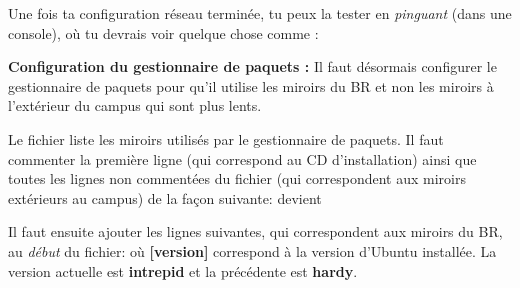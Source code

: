 % 
% 
% 
% 


Une fois ta configuration réseau terminée, tu peux la tester en \emph{pinguant} \fkz (dans une console), où tu devrais voir quelque chose comme :


\label{ubuntu_mirror} {\bf Configuration du gestionnaire de paquets
:} Il faut désormais configurer le gestionnaire de paquets pour
qu'il utilise les miroirs du BR et non les miroirs à l'extérieur du
campus qui sont plus lents.

Le fichier  liste les miroirs utilisés par le gestionnaire de paquets. Il faut commenter la première ligne (qui
correspond au CD d'installation) ainsi que toutes les lignes non commentées du fichier (qui correspondent aux miroirs extérieurs au campus) de la
façon suivante:
devient

Il faut ensuite ajouter les lignes suivantes, qui correspondent aux miroirs du BR, au \emph{début} du fichier:
où \textbf{[version]} correspond à la version d'Ubuntu installée. La version actuelle est \textbf{intrepid} et la précédente est \textbf{hardy}.

